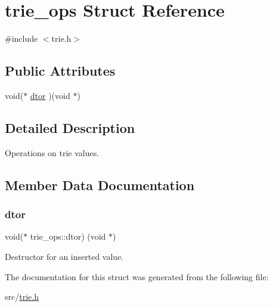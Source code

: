 \hypertarget{structtrie__ops}{}\section{trie\+\_\+ops Struct Reference}
\label{structtrie__ops}


{\ttfamily \#include $<$trie.\+h$>$}

\subsection*{Public Attributes}
\begin{DoxyCompactItemize}
\item 
void($\ast$ \mbox{\hyperlink{structtrie__ops_aff5ce0c5a4080e51095537fa7736a703}{dtor}} )(void $\ast$)
\end{DoxyCompactItemize}


\subsection{Detailed Description}
Operations on trie values. 

\subsection{Member Data Documentation}
\mbox{\label{structtrie__ops_aff5ce0c5a4080e51095537fa7736a703}} 
\subsubsection{\texorpdfstring{dtor}{dtor}}
{\footnotesize\ttfamily void($\ast$ trie\+\_\+ops\+::dtor) (void $\ast$)}

Destructor for an inserted value. 

The documentation for this struct was generated from the following file\+:\begin{DoxyCompactItemize}
\item 
src/\mbox{\hyperlink{trie_8h}{trie.\+h}}\end{DoxyCompactItemize}
